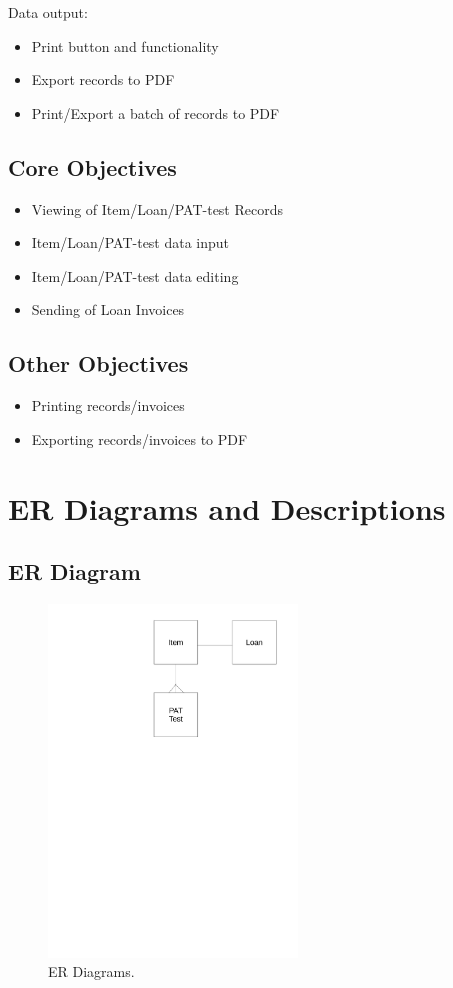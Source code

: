 \documentclass[a4paper,12pt]{report}
\begin{document}
\noindent Data output:
\begin{itemize}
    \item Print button and functionality
    \item Export records to PDF
    \item Print/Export a batch of records to PDF
\end{itemize}


\subsection{Core Objectives}

\begin{itemize}
    \item Viewing of Item/Loan/PAT-test Records
    \item Item/Loan/PAT-test data input
    \item Item/Loan/PAT-test data editing
    \item Sending of Loan Invoices
\end{itemize}

\subsection{Other Objectives}

\begin{itemize}
    \item Printing records/invoices
    \item Exporting records/invoices to PDF
\end{itemize}

\section{ER Diagrams and Descriptions}

\subsection{ER Diagram}

\begin{figure}[H]
    \caption{ER Diagrams.} \label{fig:ER Diagrams}
    \centerline{\includegraphics[width=250px]{./ER_Diagrams/ER_Diagrams.pdf}}
\end{figure}
\end{document}
